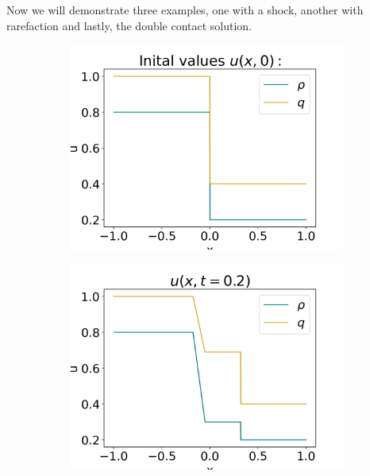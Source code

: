 \documentclass[10pt]{article}
\numberwithin{equation}{section}
\begin{document}
Now we will demonstrate three examples, one with a shock, another with rarefaction and lastly, the double contact solution.
\begin{figure}
     \centering
     \begin{subfigure}[t]{0.2\textwidth}
         \centering
         \includegraphics[width=\textwidth]{Figures/Model/Plots/SysRarefacIV.png}
     \end{subfigure}
     \begin{subfigure}[t]{0.2\textwidth}
         \centering
         \includegraphics[width=\textwidth]{Figures/Model/Plots/SysRarefacAtTime2.png}
     \end{subfigure}
     \begin{subfigure}[t]{0.2\textwidth}

\end{subfigure}
\end{figure}
\end{document}
